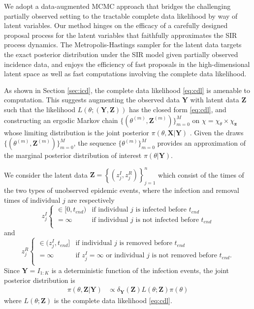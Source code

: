\documentclass[12pt]{article}
\begin{document}
	We adopt a data-augmented MCMC approach that bridges the challenging partially observed setting to the tractable complete data likelihood by way of latent variables. Our method hinges on the efficacy of a carefully designed proposal process for the latent variables that faithfully approximates the SIR process dynamics.
	The Metropolis-Hastings sampler for the latent data targets the exact posterior distribution under the SIR model given partially observed incidence data, and enjoys the efficiency of fast proposals in the high-dimensional latent space as well as fast computations involving the complete data likelihood.
	
	As shown in Section \ref{sec:icd}, the complete data likelihood \eqref{eq:cdl} is amenable to computation. This suggests augmenting the observed data $\mathbf{Y}$ with latent data $\mathbf{Z}$ such that the likelihood $L(\theta; (\mathbf{Y}, \mathbf{Z}))$ has the closed form \eqref{eq:cdl}, and constructing an ergodic Markov chain $\{(\theta^{(m)}, \mathbf{Z}^{(m)})\}_{m=0}^M$ on $\chi = \chi_{\theta} \times \chi_{\mathbf{z}}$ whose limiting distribution is the joint posterior $\pi(\theta, \mathbf{X}|\mathbf{Y})$ %
	. Given the draws $\{(\theta^{(m)}, \mathbf{Z}^{(m)})\}_{m=0}^M$, the sequence $\{\theta^{(m)}\}_{m=0}^M$ provides an approximation of the marginal posterior distribution of interest $\pi(\theta|\mathbf{Y})$.
	
	We consider the latent data $\mathbf{Z} = \left\lbrace (z^I_j, z^R_j)\right\rbrace_{j=1}^{n}$ which consist of the times of the two types of unobserved epidemic events, where the infection and removal times of individual $j$ are respectively
	$$z^I_j \begin{cases}
		\in [0, t_{end}) & \text{if individual } j \text{ is infected before } t_{end} \\
		= \infty & \text{if individual } j \text{ is not infected before } t_{end} \\
	\end{cases}$$
	and
	$$z^R_j \begin{cases}
		\in (z^I_j, t_{end}] & \text{if individual } j \text{ is removed before } t_{end} \\
		= \infty & \text{if } z^I_j = \infty \text{ or individual } j \text{ is not removed before } t_{end}. \\
	\end{cases}$$
	Since $\mathbf{Y} = I_{1:K}$ is a deterministic function of the infection events, the joint posterior distribution is
	\begin{align*}
		\pi(\theta, \mathbf{Z}|\mathbf{Y})
		& \propto \delta_{\mathbf{Y}}(\mathbf{Z}) L(\theta; \mathbf{Z}) \pi(\theta)
	\end{align*}
	where $L(\theta; \mathbf{Z})$ is the complete data likelihood \eqref{eq:cdl}.
	
\end{document}
